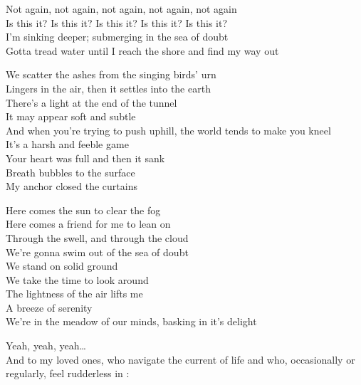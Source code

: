
Not again, not again, not again, not again, not again\\
Is this it? Is this it? Is this it? Is this it? Is this it?\\
I'm sinking deeper; submerging in the sea of doubt\\
Gotta tread water until I reach the shore and find my way out\\


We scatter the ashes from the singing birds' urn\\
Lingers in the air, then it settles into the earth\\
There's a light at the end of the tunnel\\
It may appear soft and subtle\\
And when you're trying to push uphill, the world tends to make you kneel\\
It's a harsh and feeble game\\
Your heart was full and then it sank\\
Breath bubbles to the surface\\
My anchor closed the curtains\\


Here comes the sun to clear the fog\\
Here comes a friend for me to lean on\\
Through the swell, and through the cloud\\
We're gonna swim out of the sea of doubt\\

We stand on solid ground\\
We take the time to look around\\
The lightness of the air lifts me\\
A breeze of serenity\\
We're in the meadow of our minds, basking in it's delight\\




Yeah, yeah, yeah…\\
And to my loved ones, who navigate the current of life and who, occasionally or regularly, feel rudderless in :\\

